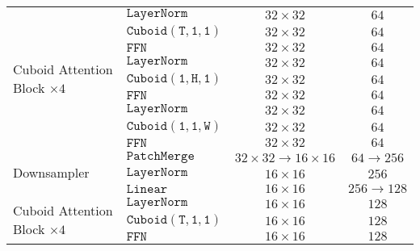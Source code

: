 \documentclass{article}
\begin{document}
\begin{table}[!tb]
\begin{center}
{\begin{tabular}{l|l|c|c}
    \multirow{9}{*}{Cuboid Attention Block $\times 4$}  & $\mathtt{LayerNorm}$      & $32\times32$                      & $64$              \\
                                                        & $\mathtt{Cuboid(T,1,1)}$  & $32\times32$                      & $64$              \\
                                                        & $\mathtt{FFN}$            & $32\times32$                      & $64$              \\
                                                        & $\mathtt{LayerNorm}$      & $32\times32$                      & $64$              \\
                                                        & $\mathtt{Cuboid(1,H,1)}$  & $32\times32$                      & $64$              \\
                                                        & $\mathtt{FFN}$            & $32\times32$                      & $64$              \\
                                                        & $\mathtt{LayerNorm}$      & $32\times32$                      & $64$              \\
                                                        & $\mathtt{Cuboid(1,1,W)}$  & $32\times32$                      & $64$              \\
                                                        & $\mathtt{FFN}$            & $32\times32$                      & $64$              \\\hline
    \multirow{3}{*}{Downsampler}                        & $\mathtt{PatchMerge}$     & $32\times32\rightarrow16\times16$ & $64\rightarrow256$\\
                                                        & $\mathtt{LayerNorm}$      & $16\times16$                      & $256$             \\
                                                        & $\mathtt{Linear}$         & $16\times16$                      & $256\rightarrow128$\\\hline  
    \multirow{9}{*}{Cuboid Attention Block $\times 4$}  & $\mathtt{LayerNorm}$      & $16\times16$                      & $128$             \\
                                                        & $\mathtt{Cuboid(T,1,1)}$  & $16\times16$                      & $128$             \\
                                                        & $\mathtt{FFN}$            & $16\times16$                      & $128$             \\

\end{tabular}}
\end{center}
\end{table}
\end{document}
